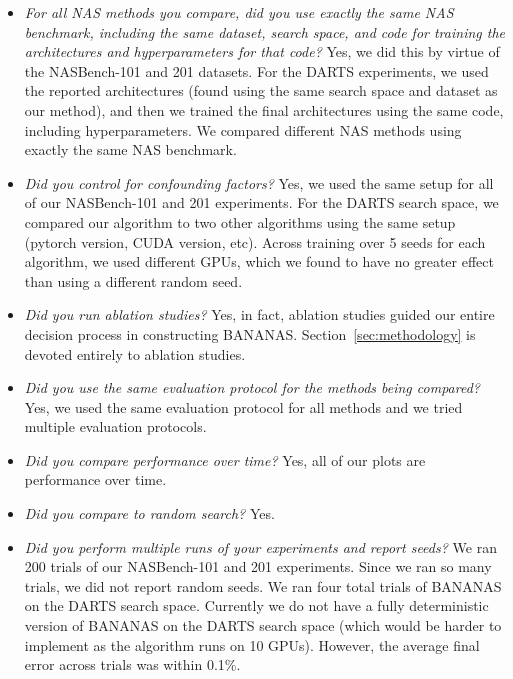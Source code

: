 \documentclass[11pt]{article}
\numberwithin{equation}{section}
\numberwithin{figure}{section}
\theoremstyle{plain}
\theoremstyle{definition}
\begin{document}
\begin{itemize}
    \item \emph{For all NAS methods you compare, did you use exactly the same NAS benchmark, including the same dataset, search space, and code for training the architectures and hyperparameters for that code?}
    Yes, we did this by virtue of the NASBench-101 and 201 datasets.
    For the DARTS experiments, we used the reported architectures (found using the same search space and dataset as our method),
    and then we trained the final architectures using the same code, including hyperparameters.
    We compared different NAS methods using exactly the same NAS benchmark.
    \item \emph{Did you control for confounding factors?}
    Yes, we used the same setup for all of our NASBench-101 and 201 experiments. 
    For the DARTS search space, we compared our algorithm to two other algorithms using the same setup (pytorch version, CUDA version, etc).
    Across training over 5 seeds for each algorithm, we used different GPUs, 
    which we found to have no greater effect than using a different random seed.
    \item \emph{Did you run ablation studies?}
    Yes, in fact, ablation studies guided our entire decision process in constructing
    BANANAS. Section~\ref{sec:methodology} is devoted entirely to ablation studies.
    \item \emph{Did you use the same evaluation protocol for the methods being compared?}
    Yes, we used the same evaluation protocol for all methods and we tried multiple evaluation protocols.
    \item \emph{Did you compare performance over time?}
    Yes, all of our plots are performance over time.
    \item \emph{Did you compare to random search?}
    Yes.
    \item \emph{Did you perform multiple runs of your experiments and report seeds?}
    We ran 200 trials of our NASBench-101 and 201 experiments. Since we ran so many trials, we did not report random seeds.
    We ran four total trials of BANANAS on the DARTS search space. 
    Currently we do not have a fully deterministic version of BANANAS on the DARTS search space 
    (which would be harder to implement as the algorithm runs on 10 GPUs).
    However, the average final error across trials was within 0.1\%.
    

\end{itemize}
\end{document}
